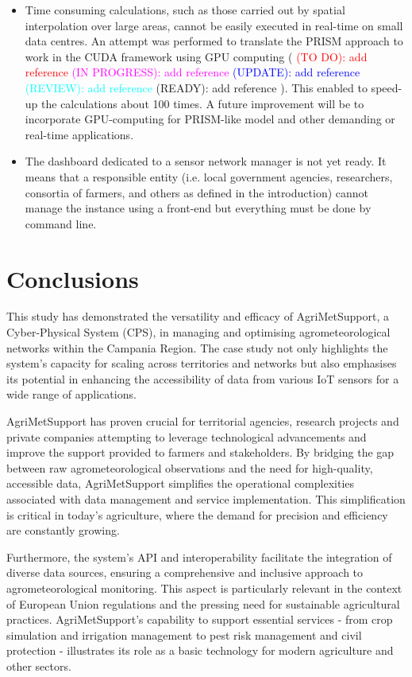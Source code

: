 \documentclass[authoryear,preprint,review,12pt]{elsarticle}
\newcommand{\statusblock}[3]{
    \ifthenelse{\equal{#2}{todo}}
        {\textcolor{red}{#1 (TO DO): #3}}
        {}
    \ifthenelse{\equal{#2}{wip}}
        {\textcolor{magenta}{#1 (IN PROGRESS): #3}}
        {}
    \ifthenelse{\equal{#2}{update}}
        {\textcolor{blue}{#1 (UPDATE): #3}}
        {}
    \ifthenelse{\equal{#2}{review}}
        {\textcolor{cyan}{#1 (REVIEW): #3}}
        {}
    \ifthenelse{\equal{#2}{done}}
        {\textcolor{PineGreen}{#1 (READY): #3}}
        {}
}
\begin{document}
\begin{itemize}
    \item Time consuming calculations, such as those carried out by spatial interpolation over large areas, cannot be easily executed in real-time on small data centres. 
    An attempt was performed to translate the PRISM approach to work in the CUDA framework using GPU computing (\statusblock{}{wip}{add reference}).
    This enabled to speed-up the calculations about 100 times.
    A future improvement will be to incorporate GPU-computing for PRISM-like model and other demanding or real-time applications.

    \item The dashboard dedicated to a sensor network manager is not yet ready. It means that a responsible entity (i.e. local government agencies, researchers, consortia of farmers, and others as defined in the introduction) cannot manage the instance using a front-end but everything must be done by command line.
    
\end{itemize}

\section{Conclusions}
This study has demonstrated the versatility and efficacy of Agri\-Met\-Support, a Cyber-Physical System (CPS), in managing and optimising agrometeorological networks within the Campania Region.
The case study not only highlights the system's capacity for scaling across territories and networks but also emphasises its potential in enhancing the accessibility of data from various IoT sensors for a wide range of applications.

Agri\-Met\-Support has proven crucial 
for territorial agencies, research pro\-jects and private companies attempting
to leverage technological advancements and improve the support provided to farmers and stakeholders. 
By bridging the gap between raw agrometeorological observations and the need for high-quality, accessible data, Agri\-Met\-Support simplifies the operational complexities associated with data management and service implementation. 
This simplification is critical in today's agriculture, where the demand for precision and efficiency are constantly growing.

Furthermore, the system's API and interoperability facilitate the integration of diverse data sources, ensuring a comprehensive and inclusive approach to agrometeorological monitoring. This aspect is particularly relevant in the context of European Union regulations and the pressing need for sustainable agricultural practices.
AgriMetSupport's capability to support essential services - from crop simulation and irrigation management to pest risk management and civil protection - illustrates its role as a basic technology for modern agriculture and other sectors.
\end{document}
